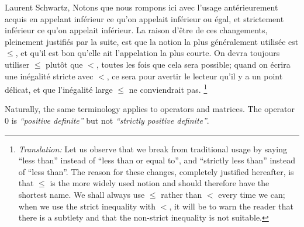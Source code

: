 \begin{aquote}{Laurent Schwartz, \cite[p.~17]{Schwartz1981}}
    Notons que nous rompons ici avec l'usage ant\'erieurement acquis
    en appelant inf\'erieur ce qu'on appelait inf\'erieur ou \'egal,
    et strictement inf\'erieur ce qu'on appelait inf\'erieur.
    La raison d'\^etre de ces changements,
    pleinement justifi\'es par la suite,
    est que la notion la plus g\'en\'eralement utilis\'ee est $\leq$,
    et qu'il est bon qu'elle ait l'appelation la plus courte.
    On devra toujours utiliser $\leq$ plut\^ot que $<$,
    toutes les fois que cela sera possible;
    quand on \'ecrira une in\'egalit\'e stricte avec $<$,
    ce sera pour avertir le lecteur qu'il y a un point d\'elicat,
    et que l'in\'egalit\'e large $\leq$ ne conviendrait pas.
    \footnote{%
        \emph{Translation:}
        Let us observe that we break from traditional usage
        by saying ``less than'' instead of ``less than or equal to'',
        and ``strictly less than'' instead of ``less than''.
        The reason for these changes,
        completely justified hereafter,
        is that $\leq$ is the more widely used notion
        and should therefore have the shortest name.
        We shall always use $\leq$ rather than $<$
        every time we can;
        when we use the strict inequality with $<$,
        it will be to warn the reader that there is a subtlety
        and that the non-strict inequality is not suitable.
    }
\end{aquote}

Naturally, the same terminology applies to operators and matrices.
The operator $0$ is \emph{``positive definite''} but not \emph{``strictly positive definite''}.
